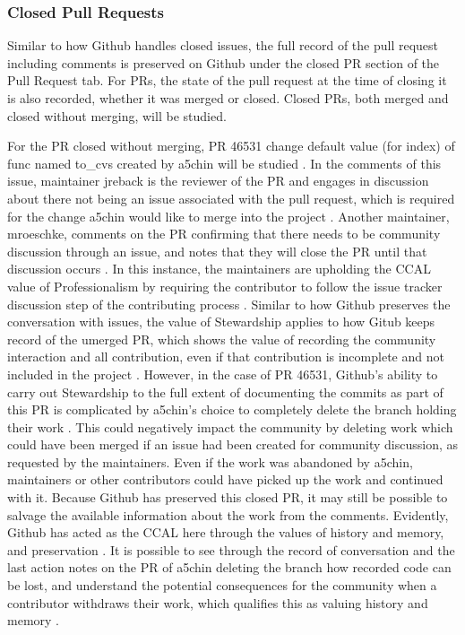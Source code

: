 \subsubsection{Closed Pull Requests}

Similar to how Github handles closed issues, the full record of the pull request including comments is preserved on Github under the closed PR section of the Pull Request tab. For PRs, the state of the pull request at the time of closing it is also recorded, whether it was merged or closed. Closed PRs, both merged and closed without merging, will be studied. 

For the PR closed without merging, PR 46531 change default value (for index) of func named to\_cvs created by a5chin will be studied \cite{pandasrepo}. In the comments of this issue, maintainer jreback is the reviewer of the PR and engages in discussion about there not being an issue associated with the pull request, which is required for the change a5chin would like to merge into the project \cite{pandasrepo}. Another maintainer, mroeschke, comments on the PR confirming that there needs to be community discussion through an issue, and notes that they will close the PR until that discussion occurs \cite{pandasrepo}. In this instance, the maintainers are upholding the CCAL value of Professionalism by requiring the contributor to follow the issue tracker discussion step of the contributing process \cite{rubin2016foundationslis}. Similar to how Github preserves the conversation with issues, the value of Stewardship applies to how Gitub keeps record of the umerged PR, which shows the value of recording the community interaction and all contribution, even if that contribution is incomplete and not included in the project \cite{gorman2000values}. However, in the case of PR 46531, Github's ability to carry out Stewardship to the full extent of documenting the commits as part of this PR is complicated by a5chin's choice to completely delete the branch holding their work \cite{pandasrepo}. This could negatively impact the community by deleting work which could have been merged if an issue had been created for community discussion, as requested by the maintainers. Even if the work was abandoned by a5chin, maintainers or other contributors could have picked up the work and continued with it. Because Github has preserved this closed PR, it may still be possible to salvage the available information about the work from the comments. Evidently, Github has acted as the CCAL here through the values of history and memory, and preservation \cite{rubin2016foundationslis}. It is possible to see through the record of conversation and the last action notes on the PR of a5chin deleting the branch how recorded code can be lost, and understand the potential consequences for the community when a contributor withdraws their work, which qualifies this as valuing history and memory \cite{rubin2016foundationslis}.

